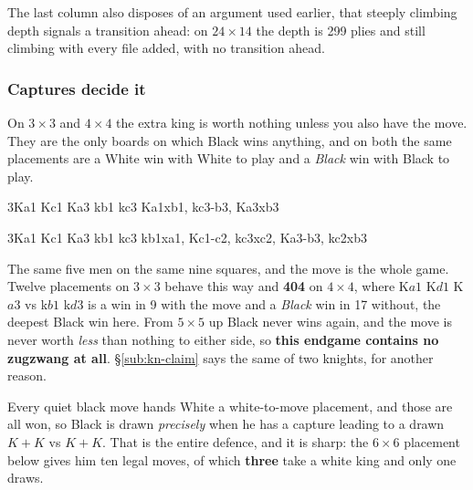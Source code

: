 \documentclass[10pt]{article}
\begin{document}
\smallskip
\noindent
The last column also disposes of an argument used earlier, that steeply
climbing depth signals a transition ahead: on $24\times14$ the depth is 299
plies and still climbing with every file added, with no transition ahead.

\subsubsection{Captures decide it}\label{sub:kings-tempo}

\noindent
On $3\times3$ and $4\times4$ the extra king is worth nothing unless you also
have the move. They are the only boards on which Black wins anything, and on
both the same placements are a White win with White to play and a \emph{Black}
win with Black to play.

\medskip
\noindent
\begin{stepboard}[width=0.30\textwidth,board=2.44cm,height=42mm,variant=C,
  intro={\textbf{White to move: White wins in 3 plies}}]{3}{Ka1 Kc1 Ka3 kb1 kc3}
  Ka1xb1, kc3-b3, Ka3xb3
\end{stepboard}\hfill
\begin{stepboard}[width=0.30\textwidth,board=2.44cm,height=42mm,variant=C,
  intro={\textbf{Black to move: BLACK wins in 5 plies}}]{3}{Ka1 Kc1 Ka3 kb1 kc3}
  kb1xa1, Kc1-c2, kc3xc2, Ka3-b3, kc2xb3
\end{stepboard}\hfill
\begin{minipage}[t]{0.34\textwidth}\vspace{0pt}\small
The same five men on the same nine squares, and the move is the whole game.
Twelve placements on $3\times3$ behave this way and \textbf{404} on $4\times4$,
where K$a1$ K$d1$ K$a3$ vs k$b1$ k$d3$ is a win in 9 with the move and a
\emph{Black} win in 17 without, the deepest Black win here. From $5\times5$ up
Black never wins again, and the move is never worth \emph{less} than nothing to
either side, so \textbf{this endgame contains no zugzwang at all}.
\S\ref{sub:kn-claim} says the same of two knights, for another reason.
\end{minipage}

\medskip
\noindent
Every quiet black move hands White a white-to-move placement, and those are all
won, so Black is drawn \emph{precisely} when he has a capture leading to a
drawn $K\!+\!K$ vs $K\!+\!K$. That is the entire defence, and it is sharp: the
$6\times6$ placement below gives him ten legal moves, of which \textbf{three}
take a white king and only one draws.
\end{document}
